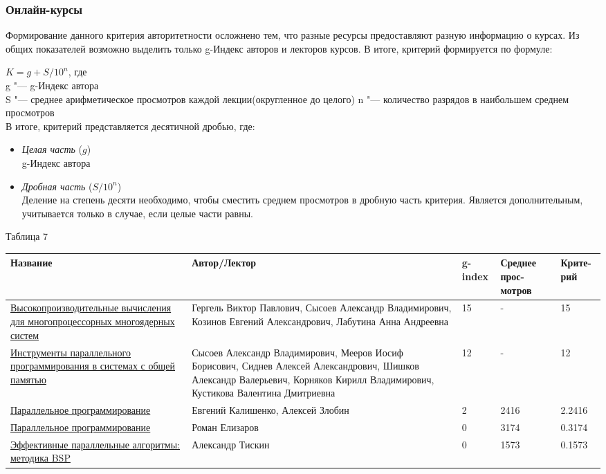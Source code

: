 \documentclass{article}
\begin{document}
		\subsubsection{Онлайн-курсы}
		Формирование данного критерия авторитетности осложнено тем, что разные ресурсы предоставляют разную информацию о курсах. Из общих показателей возможно выделить только g-Индекс авторов и лекторов курсов. В итоге, критерий формируется по формуле:
		 
		 $ K = g + S / 10^n $, где \\
			g "--- g-Индекс автора\\
			S "--- среднее арифметическое просмотров каждой лекции(округленное до целого)
			n "--- количество разрядов в наибольшем среднем просмотров\\			
			В итоге, критерий представляется десятичной дробью, где: 
				\begin{itemize}
					\item \textit{Целая часть} ($g$)\\
						g-Индекс автора
					\item \textit{Дробная часть} ($S / 10^n$)\\
						Деление на степень десяти необходимо, чтобы сместить среднем просмотров в дробную часть критерия. Является дополнительным, учитывается только в случае, если целые части равны.
				\end{itemize}
			\begin{flushleft}
				Таблица 7
				\begin{longtable}{|p{5.5cm}|p{5cm}|p{1.55cm}|p{1.7cm}|p{1.5cm}|}
\hline
Название & Автор/Лектор & g-index & Среднее прос-мотров & Крите-рий \\\hline

\href{http://www.hpcc.unn.ru/?doc=489}{Высокопроизводительные вычисления для многопроцессорных многоядерных систем} &
Гергель Виктор Павлович, Сысоев Александр Владимирович, Козинов Евгений Александрович, Лабутина Анна Андреевна & 15 & - & 15\\\hline

\href{http://www.hpcc.unn.ru/?doc=444}{Инструменты параллельного программирования в системах с общей памятью} &
Сысоев Александр Владимирович, Мееров Иосиф Борисович, Сиднев Алексей Александрович, Шишков Александр Валерьевич, Корняков Кирилл Владимирович, Кустикова Валентина Дмитриевна &
12 & - & 12\\\hline

\href{https://www.lektorium.tv/course/23050 }{Параллельное программирование} &
Евгений Калишенко, Алексей Злобин & 2 & 2416 & 2.2416\\\hline

\href{https://www.lektorium.tv/course/22757}{Параллельное программирование} &
Роман Елизаров & 0 & 3174 & 0.3174 \\\hline

\href{https://www.lektorium.tv/course/22913}{Эффективные параллельные алгоритмы: методика BSP} &
Александр Тискин & 0 & 1573 & 0.1573 \\\hline

				\end{longtable}
			\end{flushleft}
\newpage
\end{document}
